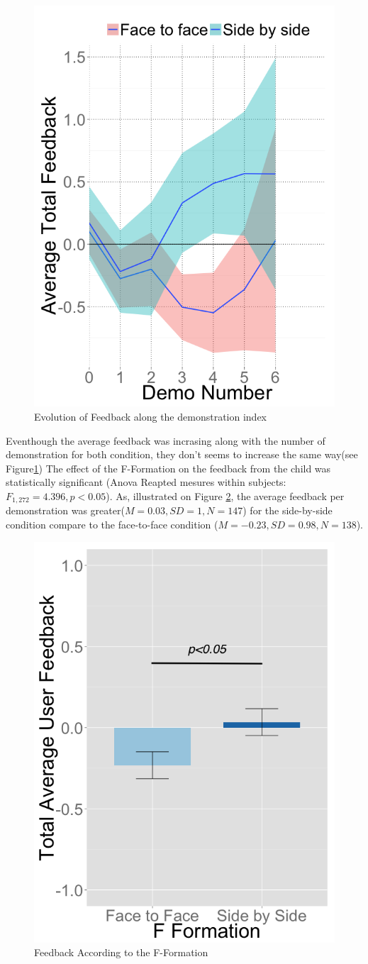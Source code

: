 \documentclass[letterpaper, 10 pt, conference]{ieeeconf}  %
\begin{document}
\begin{figure}
	\centering
	\includegraphics[width=0.75\linewidth]{figures/plots/evoldemocondbis}
	\caption{Evolution of Feedback along the demonstration index}
	\label{fig:uf_nb}
\end{figure}
Eventhough the average feedback was incrasing along with the number of demonstration for both condition, they don't seems to increase the same way(see Figure\ref{fig:uf_nb})
The effect of the F-Formation on the feedback from the child was statistically significant (Anova Reapted mesures within subjects: $F_{1,272}= 4.396, p<0.05$). As, illustrated on Figure \ref{fig:userfeedback_fformation_se}, the average feedback per demonstration was greater($M=0.03, SD=1, N=147$) for the side-by-side condition compare to the face-to-face condition ($M=-0.23, SD=0.98, N=138$).
 \begin{figure}
 	\centering
 	\includegraphics[width=0.58\linewidth]{figures/plots/userfeedback_fformation_se}
 	\caption{Feedback According to the F-Formation}
 	\label{fig:userfeedback_fformation_se}
 \end{figure}
\end{document}
